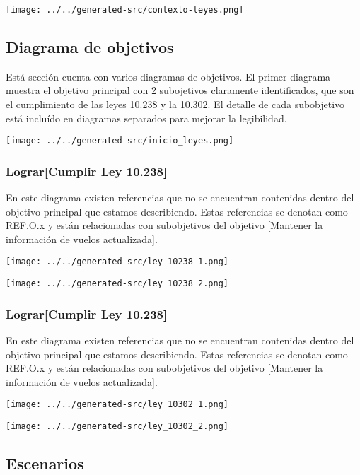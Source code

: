 \texttt{[image: ../../generated-src/contexto-leyes.png]}

\subsection{Diagrama de objetivos}
Está sección cuenta con varios diagramas de objetivos. 
El primer diagrama muestra el objetivo principal con 2 subojetivos claramente identificados, que
son el cumplimiento de las leyes 10.238 y la 10.302.
El detalle de cada subobjetivo está incluído en diagramas separados para mejorar la legibilidad.

\texttt{[image: ../../generated-src/inicio\_leyes.png]}

\subsubsection{Lograr[Cumplir Ley 10.238]}
En este diagrama existen referencias que no se encuentran contenidas dentro del
objetivo principal que estamos describiendo. Estas referencias se denotan como REF.O.x
y están relacionadas con subobjetivos del objetivo [Mantener la información de vuelos actualizada].

\texttt{[image: ../../generated-src/ley\_10238\_1.png]}

\texttt{[image: ../../generated-src/ley\_10238\_2.png]}

\subsubsection{Lograr[Cumplir Ley 10.238]}
En este diagrama existen referencias que no se encuentran contenidas dentro del
objetivo principal que estamos describiendo. Estas referencias se denotan como REF.O.x
y están relacionadas con subobjetivos del objetivo [Mantener la información de vuelos actualizada].

\texttt{[image: ../../generated-src/ley\_10302\_1.png]}

\texttt{[image: ../../generated-src/ley\_10302\_2.png]}

\subsection{Escenarios}

